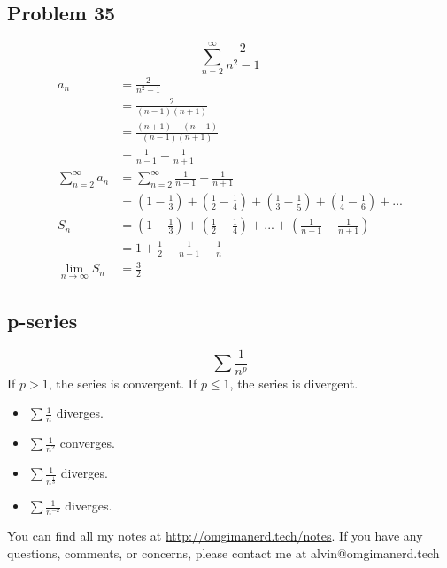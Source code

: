 \documentclass[letterpaper, 12pt]{math}
\begin{document}
\subsection*{Problem 35}
\[ \sum_{n=2}^{\infty}\frac{2}{n^{2}-1} \]
\begin{align*}
  a_{n} &= \frac{2}{n^{2}-1} \\
  &= \frac{2}{(n-1)(n+1)} \\
  &= \frac{(n+1)-(n-1)}{(n-1)(n+1)} \\
  &= \frac{1}{n-1}-\frac{1}{n+1} \\
  \sum_{n=2}^{\infty}a_{n} &= \sum_{n=2}^{\infty}\frac{1}{n-1}-\frac{1}{n+1} \\
  &= (1-\frac{1}{3})+(\frac{1}{2}-\frac{1}{4})+(\frac{1}{3}-\frac{1}{5})+
    (\frac{1}{4}-\frac{1}{6})+... \\
  S_{n} &= (1-\frac{1}{3})+(\frac{1}{2}-\frac{1}{4})+...+
    (\frac{1}{n-1}-\frac{1}{n+1}) \\
  &= 1+\frac{1}{2}-\frac{1}{n-1}-\frac{1}{n} \\
  \lim_{n\to\infty}S_{n} &= \frac{3}{2}
\end{align*}

\subsection*{p-series}
\[ \sum\frac{1}{n^{p}} \]
If \( p > 1 \), the series is convergent. If \( p \leq 1 \), the series is
divergent.
\begin{itemize}
  \item \( \sum\frac{1}{n} \) diverges.
  \item \( \sum\frac{1}{n^{2}} \) converges.
  \item \( \sum\frac{1}{n^{\frac{1}{3}}} \) diverges.
  \item \( \sum\frac{1}{n^{-2}} \) diverges.
\end{itemize}

\begin{center}
  You can find all my notes at \url{http://omgimanerd.tech/notes}. If you have
  any questions, comments, or concerns, please contact me at
  alvin@omgimanerd.tech
\end{center}
\end{document}
